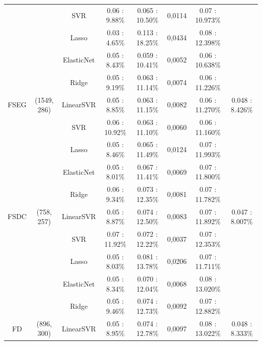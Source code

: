 \begin{table}
{{\begin{tabular}{|c|c|c|c|c|c|c|c|}
				&              &         SVR &   0.06 : 9.88\% &  0.065  : 10.50\% &       0,0114 &  0.07 : 10.973\% &                  \\ \cline{3-8}
				&              &       Lasso &   0.03 : 4.65\% &  0.113  : 18.25\% &       0,0434 &  0.08 : 12.398\% &                  \\ \cline{1-8}
				&              &  ElasticNet &   0.05 : 8.43\% &  0.059  : 10.41\% &       0,0052 &  0.06 : 10.638\% &                  \\ \cline{3-8}
				&              &       Ridge &   0.05 : 9.19\% &  0.063  : 11.14\% &       0,0074 &  0.06 : 11.226\% &                  \\ \cline{3-8}
				FSEG &  (1549, 286) &   LinearSVR &   0.05 : 8.85\% &  0.063  : 11.15\% &       0,0082 &  0.06 : 11.270\% &   0.048 : 8.426\% \\ \cline{3-8}
				&              &         SVR &  0.06 : 10.92\% &  0.063  : 11.10\% &       0,0060 &  0.06 : 11.160\% &                  \\ \cline{3-8}
				&              &       Lasso &   0.05 : 8.46\% &  0.065  : 11.49\% &       0,0124 &  0.07 : 11.993\% &                  \\ \cline{1-8}
				&              &  ElasticNet &   0.05 : 8.01\% &  0.067  : 11.41\% &       0,0069 &  0.07 : 11.800\% &                  \\ \cline{3-8}
				&              &       Ridge &   0.06 : 9.34\% &  0.073  : 12.35\% &       0,0081 &  0.07 : 11.782\% &                  \\ \cline{3-8}
				FSDC &   (758, 257) &   LinearSVR &   0.05 : 8.87\% &  0.074  : 12.50\% &       0,0083 &  0.07 : 11.892\% &   0.047 : 8.007\% \\ \cline{3-8}
				&              &         SVR &  0.07 : 11.92\% &  0.072  : 12.22\% &       0,0037 &  0.07 : 12.353\% &                  \\ \cline{3-8}
				&              &       Lasso &   0.05 : 8.03\% &  0.081  : 13.78\% &       0,0206 &  0.07 : 11.711\% &                  \\ \cline{1-8}
				&              &  ElasticNet &   0.05 : 8.34\% &  0.070  : 12.04\% &       0,0068 &  0.08 : 13.020\% &                  \\ \cline{3-8}
				&              &       Ridge &   0.05 : 9.46\% &  0.074  : 12.73\% &       0,0092 &  0.07 : 12.882\% &                  \\ \cline{3-8}
				FD &   (896, 300) &   LinearSVR &   0.05 : 8.95\% &  0.074  : 12.78\% &       0,0097 &  0.08 : 13.022\% &   0.048 : 8.333\% \\ \cline{3-8}

\end{tabular}}}
\end{table}
